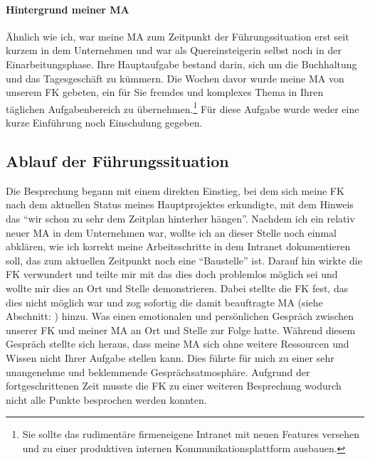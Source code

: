 \paragraph*{Hintergrund meiner \ac{MA}}
\label{para:hintergrungMA}
Ähnlich wie ich, war meine \ac{MA} zum Zeitpunkt der Führungssituation erst seit kurzem in dem Unternehmen und war als Quereinsteigerin selbst noch in der  Einarbeitungsphase. 
Ihre Hauptaufgabe bestand darin, sich um die Buchhaltung und das Tagesgeschäft zu kümmern.
Die Wochen davor wurde meine \ac{MA} von unserem \ac{FK} gebeten, ein für Sie fremdes und komplexes Thema in Ihren täglichen Aufgabenbereich zu übernehmen.\footnote{Sie sollte das rudimentäre firmeneigene Intranet mit neuen Features versehen und zu einer produktiven internen Kommunikationsplattform ausbauen.} 
Für diese Aufgabe wurde weder eine kurze Einführung noch Einschulung gegeben.
\begin{comment}
Tagesbesprechung zwischen meiner \ac{MA}\footnote{Diese wurde erst nachträglich zum Gespräch beordert}, unserer \ac{FK} und mir. 
\end{comment}


\subsection*{Ablauf der Führungssituation}
\label{subsec:ablauf_situation}
Die Besprechung begann mit einem direkten Einstieg, bei dem sich meine \ac{FK} nach dem aktuellen Status meines Hauptprojektes erkundigte, mit dem Hinweis das "`wir schon zu sehr dem Zeitplan hinterher hängen"'.
Nachdem ich ein relativ neuer \ac{MA} in dem Unternehmen war, wollte ich an dieser Stelle noch einmal abklären, wie ich korrekt meine Arbeitsschritte in dem Intranet dokumentieren soll, das zum aktuellen Zeitpunkt noch eine "`Baustelle"' ist.
Darauf hin wirkte die \ac{FK} verwundert und teilte mir mit das dies doch problemlos möglich sei und wollte mir dies an Ort und Stelle demonstrieren. 
Dabei stellte die \ac{FK} fest, das dies nicht möglich war und zog sofortig die damit beauftragte \ac{MA} (siehe Abschnitt: ) hinzu.
Was einen emotionalen und persönlichen Gespräch zwischen unserer \ac{FK} und meiner \ac{MA} an Ort und Stelle zur Folge hatte. 
Während diesem Gespräch stellte sich heraus, dass meine \ac{MA} sich ohne weitere Ressourcen und Wissen nicht Ihrer Aufgabe stellen kann. 
Dies führte für mich zu einer sehr unangenehme und beklemmende Gesprächsatmosphäre.
Aufgrund der fortgeschrittenen Zeit musste die \ac{FK} zu einer weiteren Besprechung wodurch nicht alle Punkte besprochen werden konnten.

